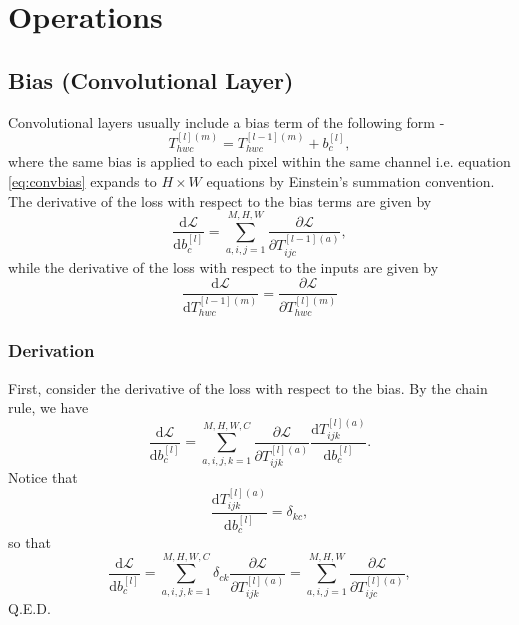 \documentclass[modern]{aastex61}
\newcommand{\uderivative}{\mathrm{d}}
\begin{document}
\section{Operations} \label{sec:op}

\subsection{Bias (Convolutional Layer)} \label{sec:bias}

Convolutional layers usually include a bias term of the following form -
\begin{equation} \label{eq:convbias}
  T^{[l](m)}_{hwc} = T^{[l-1](m)}_{hwc} + b^{[l]}_{c},
\end{equation}
where the same bias is applied to each pixel within the same channel i.e. equation \eqref{eq:convbias} expands to $H \times W$ equations by Einstein's summation convention. The derivative of the loss with respect to the bias terms are given by
\begin{equation} \label{eq:gradconvbias}
  \frac{\uderivative \mathscr{L}}{\uderivative b^{[l]}_{c}} = \sum_{a, i, j = 1}^{M, H, W} \frac{\partial \mathscr{L}}{\partial T^{[l-1](a)}_{ijc}},
\end{equation}
while the derivative of the loss with respect to the inputs are given by
\begin{equation} \label{eq:propconvbias}
  \frac{\uderivative \mathscr{L}}{\uderivative T^{[l-1](m)}_{hwc}} = \frac{\partial \mathscr{L}}{\partial  T^{[l](m)}_{hwc}}
\end{equation}

\subsubsection{Derivation}
First, consider the derivative of the loss with respect to the bias. By the chain rule, we have
\begin{equation*}
  \frac{\uderivative \mathscr{L}}{\uderivative b^{[l]}_{c}} = \sum_{a, i, j, k = 1}^{M, H, W, C} \frac{\partial \mathscr{L}}{\partial T^{[l](a)}_{ijk}} \frac{\uderivative T^{[l](a)}_{ijk}}{\uderivative b^{[l]}_{c}}.
\end{equation*}
Notice that
\begin{equation*}
  \frac{\uderivative T^{[l](a)}_{ijk}}{\uderivative b^{[l]}_{c}} = \delta_{kc},
\end{equation*} so that
\begin{equation*}
  \frac{\uderivative \mathscr{L}}{\uderivative b^{[l]}_{c}} = \sum_{a, i, j, k = 1}^{M, H, W, C} \delta_{ck} \frac{\partial \mathscr{L}}{\partial T^{[l](a)}_{ijk}} = \sum_{a, i, j = 1}^{M, H, W} \frac{\partial \mathscr{L}}{\partial T^{[l](a)}_{ijc}},
\end{equation*}
Q.E.D.
\end{document}
